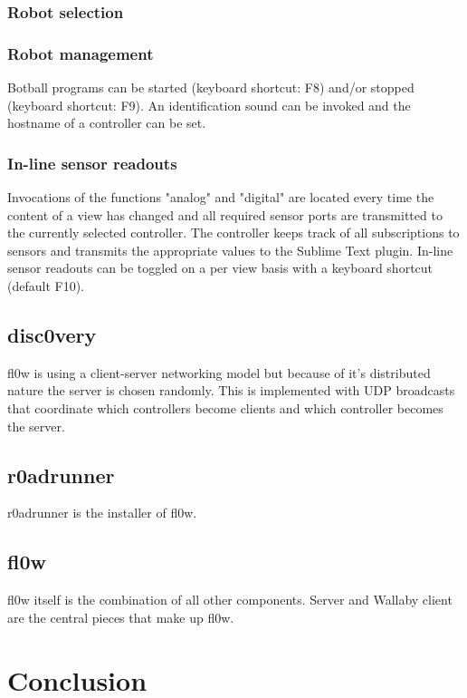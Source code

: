 \documentclass[conference]{IEEEtran}
\begin{document}
\subsubsection{Robot selection}


\subsubsection{Robot management}
Botball programs can be started (keyboard shortcut: F8) and/or stopped (keyboard shortcut: F9). An identification sound can be invoked and the hostname of a controller can be set.

\subsubsection{In-line sensor readouts}
Invocations of the functions "analog" and "digital" are located every time the content of a view has changed and all required sensor ports are transmitted to the currently selected controller. The controller keeps track of all subscriptions to sensors and transmits the appropriate values to the Sublime Text\cite{Sublime Text 3:Sublime HQ} plugin.
In-line sensor readouts can be toggled on a per view basis with a keyboard shortcut (default F10).

\subsection{disc0very}
fl0w is using a client-server networking model but because of it's distributed nature the server is chosen randomly. This is implemented with UDP broadcasts that coordinate which controllers become clients and which controller becomes the server.

\subsection{r0adrunner}
r0adrunner is the installer of fl0w.

\subsection{fl0w}
fl0w itself is the combination of all other components. Server and Wallaby client are the central pieces that make up fl0w.


\section{Conclusion}
\end{document}
